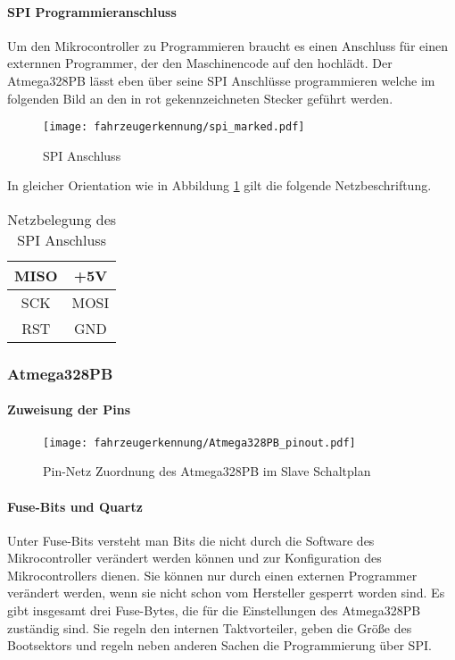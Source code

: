 \paragraph{SPI Programmieranschluss}\mbox{} 

Um den Mikrocontroller zu Programmieren braucht es einen Anschluss für einen externnen Programmer, der den Maschinencode auf den hochlädt. Der Atmega328PB lässt eben über seine SPI Anschlüsse programmieren welche im folgenden Bild
an den in rot gekennzeichneten Stecker geführt werden. 

\begin{figure}[H]
    \centering
    \texttt{[image: fahrzeugerkennung/spi\_marked.pdf]}
    \caption{SPI Anschluss}
    \label{fig:slave_left}
\end{figure}

In gleicher Orientation wie in Abbildung \ref{fig:slave_left} gilt die folgende Netzbeschriftung.

\begin{table}[H]
    \centering
    \begin{tabular}{|c|c|}
        \hline
        MISO & +5V  \\ \hline
        SCK  & MOSI \\ \hline
        RST  & GND  \\ \hline
    \end{tabular}
    \caption{Netzbelegung des SPI Anschluss}
\end{table}

\subsubsection{Atmega328PB}
\paragraph{Zuweisung der Pins}\mbox{} 

\begin{figure}[H]
    \centering
    \texttt{[image: fahrzeugerkennung/Atmega328PB\_pinout.pdf]}
    \caption{Pin-Netz Zuordnung des Atmega328PB im Slave Schaltplan}
\end{figure}

\paragraph{Fuse-Bits und Quartz}\mbox{} 

Unter Fuse-Bits versteht man Bits die nicht durch die Software des Mikrocontroller verändert werden können und zur Konfiguration des Mikrocontrollers dienen. Sie können nur durch einen externen Programmer verändert werden, 
wenn sie nicht schon vom Hersteller gesperrt worden sind. Es gibt insgesamt drei Fuse-Bytes, die für die Einstellungen des Atmega328PB zuständig sind. Sie regeln den internen Taktvorteiler, geben die Größe des Bootsektors und
regeln neben anderen Sachen die Programmierung über SPI.

